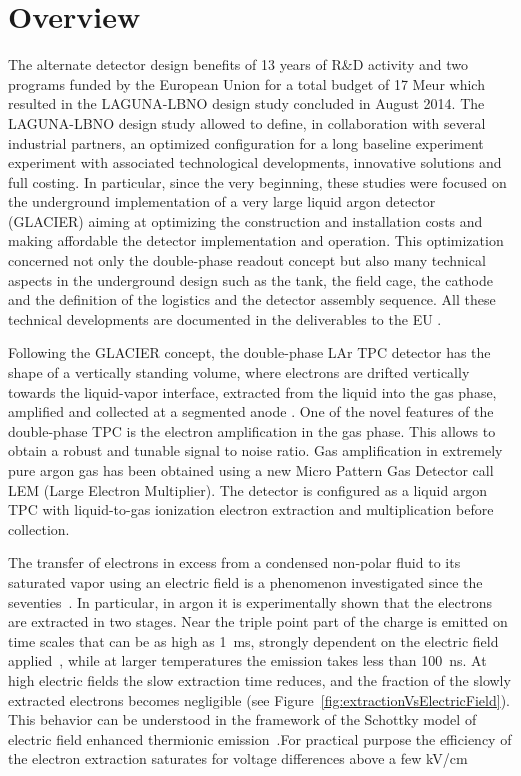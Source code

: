 \section{Overview}
\label{sec:detectors-fd-ref-ov}


The alternate detector design benefits of 13 years of R\&D activity and two programs funded by the European Union for a total budget of 17 Meur which resulted in the LAGUNA-LBNO design study concluded in August 2014. The LAGUNA-LBNO design study allowed to define, in collaboration with several industrial partners, an optimized configuration for a long baseline experiment  experiment with associated technological developments, innovative solutions and full costing. In particular, since the very beginning, these studies were focused on the underground implementation of a very large liquid argon detector (GLACIER) aiming at optimizing the construction and installation costs and making affordable the detector implementation and operation. This optimization concerned not only the double-phase readout concept but also many technical aspects in the underground design such as the tank, the field cage, the cathode  and the definition of the logistics and the detector assembly sequence. All these technical developments are documented in the deliverables to the EU \cite{LAGUNA-LBNO-deliv}.

Following the GLACIER concept, the double-phase LAr TPC detector has the shape of a vertically standing volume, where electrons are drifted vertically towards the liquid-vapor interface, extracted from the liquid into the gas phase, amplified and collected at a segmented anode \cite{Badertscher:2013wm,Badertscher:2012dq,Badertscher:2010zg}. One of the novel features of the double-phase TPC is the electron amplification in the gas phase. This allows to obtain a robust and tunable signal to noise ratio. Gas amplification in extremely pure argon gas has been obtained using a new Micro Pattern Gas Detector call LEM (Large Electron Multiplier). The detector is configured as a liquid argon TPC with liquid-to-gas ionization electron extraction and multiplication before collection.

The transfer of electrons in excess from a condensed non-polar fluid to its saturated vapor using an electric field is a phenomenon investigated since the seventies~\cite{Dolgoshein1970}. In particular, in argon it is experimentally shown that the electrons are extracted in two stages. Near the triple point part of the charge is emitted on time scales that can be as high as 1~ms, strongly dependent on the electric field applied~\cite{Gushchin1982b, Borghesani1990}, while at larger temperatures the emission takes less than 100~ns. At high electric fields the slow extraction time reduces, and the fraction of the slowly extracted electrons becomes negligible (see Figure~\ref{fig:extractionVsElectricField}). This behavior can be understood in the framework of the Schottky model of electric field enhanced thermionic emission~\cite{Murphy1956}.For practical purpose the efficiency of the electron extraction saturates for voltage differences above a few kV/cm

